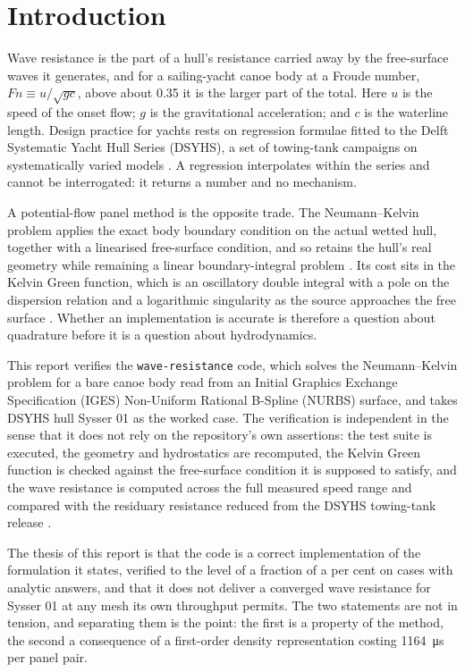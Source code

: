 \documentclass[11pt]{article}
\newcommand{\Fn}{\mathit{Fn}}
\begin{document}
\section{Introduction}
Wave resistance is the part of a hull's resistance carried away by the free-surface
waves it generates, and for a sailing-yacht canoe body at a Froude number,
$\Fn \equiv u/\sqrt{gc}$, above about 0.35 it is the larger part of the total. Here $u$
is the speed of the onset flow; $g$ is the gravitational acceleration; and $c$ is the
waterline length. Design practice for yachts rests on regression formulae fitted to the
Delft Systematic Yacht Hull Series (DSYHS), a set of towing-tank campaigns on
systematically varied models \citep{gerritsma1981, keuning2008}. A regression interpolates
within the series and cannot be interrogated: it returns a number and no mechanism.

A potential-flow panel method is the opposite trade. The Neumann--Kelvin problem applies
the exact body boundary condition on the actual wetted hull, together with a linearised
free-surface condition, and so retains the hull's real geometry while remaining a linear
boundary-integral problem \citep{wehausen1973}. Its cost sits in the Kelvin Green function,
which is an oscillatory double integral with a pole on the dispersion relation and a
logarithmic singularity as the source approaches the free surface \citep{noblesse1981,
newman1987}. Whether an implementation is accurate is therefore a question about
quadrature before it is a question about hydrodynamics.

This report verifies the \texttt{wave-resistance} code, which solves the Neumann--Kelvin
problem for a bare canoe body read from an Initial Graphics Exchange Specification (IGES)
Non-Uniform Rational B-Spline (NURBS) surface, and takes DSYHS hull Sysser 01 as the
worked case. The verification is independent in the sense that it does not rely on the
repository's own assertions: the test suite is executed, the geometry and hydrostatics are
recomputed, the Kelvin Green function is checked against the free-surface condition it is
supposed to satisfy, and the wave resistance is computed across the full measured speed
range and compared with the residuary resistance reduced from the DSYHS towing-tank
release \citep{dsyhs_meas}.

The thesis of this report is that the code is a correct implementation of the formulation
it states, verified to the level of a fraction of a per cent on cases with analytic
answers, and that it does not deliver a converged wave resistance for Sysser 01 at any
mesh its own throughput permits. The two statements are not in tension, and separating
them is the point: the first is a property of the method, the second a consequence of a
first-order density representation costing \SI{1164}{\micro\second} per panel pair.
\end{document}

